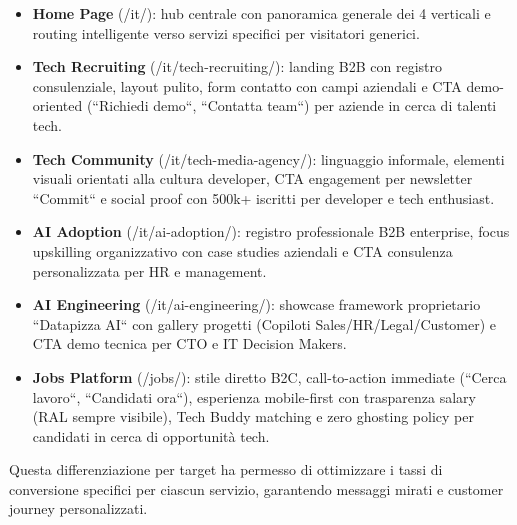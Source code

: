 \begin{itemize}
  \item \textbf{Home Page} (/it/): hub centrale con panoramica generale dei 
  4 verticali e routing intelligente verso servizi specifici per visitatori generici.
  
  \item \textbf{Tech Recruiting} (/it/tech-recruiting/): landing B2B con registro 
  consulenziale, layout pulito, form contatto con campi aziendali e CTA demo-oriented 
  (``Richiedi demo``, ``Contatta team``) per aziende in cerca di talenti tech.
  
  \item \textbf{Tech Community} (/it/tech-media-agency/): linguaggio informale, 
  elementi visuali orientati alla cultura developer, CTA engagement per newsletter 
  ``Commit`` e social proof con 500k+ iscritti per developer e tech enthusiast.
  
  \item \textbf{AI Adoption} (/it/ai-adoption/): registro professionale B2B 
  enterprise, focus upskilling organizzativo con case studies aziendali e CTA 
  consulenza personalizzata per HR e management.
  
  \item \textbf{AI Engineering} (/it/ai-engineering/): showcase framework 
  proprietario ``Datapizza AI`` con gallery progetti (Copiloti Sales/HR/Legal/Customer) 
  e CTA demo tecnica per CTO e IT Decision Makers.
  
  \item \textbf{Jobs Platform} (/jobs/): stile diretto B2C, call-to-action 
  immediate (``Cerca lavoro``, ``Candidati ora``), esperienza mobile-first con 
  trasparenza salary (RAL sempre visibile), Tech Buddy matching e zero ghosting 
  policy per candidati in cerca di opportunità tech.
\end{itemize}

Questa differenziazione per target ha permesso di ottimizzare i tassi di 
conversione specifici per ciascun servizio, garantendo messaggi mirati e 
customer journey personalizzati.

